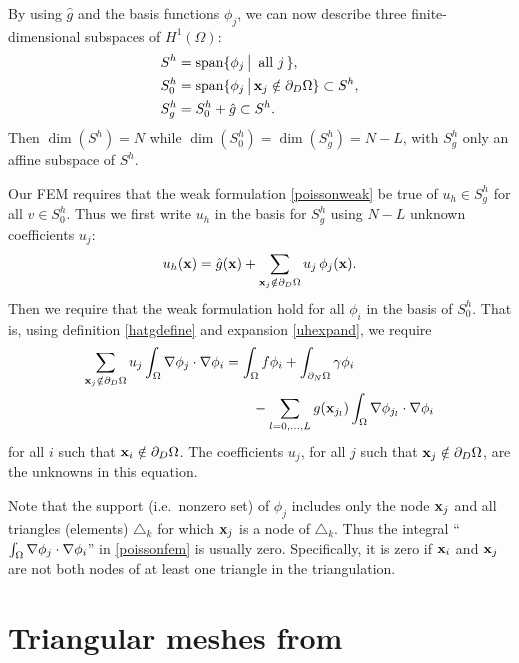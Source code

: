 By using $\hat g$ and the basis functions $\phi_j$, we can now describe three finite-dimensional subspaces of $H^1(\Omega)$:
\begin{align*}
S^h &= \operatorname{span}\{\phi_j \,\big|\, \text{ all } j\,\}, \\
S_0^h &= \operatorname{span}\{\phi_j \,\big|\, \mathbf{x}_j \notin \partial_D \Omega\} \subset S^h, \\
S_g^h &= S_0^h + \hat g \subset S^h.
\end{align*}
Then $\dim(S^h)=N$ while $\dim(S_0^h)=\dim(S_g^h)=N-L$, with $S_g^h$ only an affine subspace of $S^h$.

Our FEM requires that the weak formulation  \eqref{poissonweak} be true of $u_h\in S_g^h$ for all $v\in S_0^h$.  Thus we first write $u_h$ in the basis for $S_g^h$ using $N-L$ unknown coefficients $u_j$:
\begin{equation}
u_h(\mathbf{x}) = \hat g(\mathbf{x}) + \sum_{\mathbf{x}_j \notin \partial_D \Omega} u_j\, \phi_j(\mathbf{x}). \label{uhexpand}
\end{equation}
Then we require that the weak formulation hold for all $\phi_i$ in the basis of $S_0^h$.  That is, using definition \eqref{hatgdefine} and expansion \eqref{uhexpand}, we require
\begin{align}
\sum_{\mathbf{x}_j \notin \partial_D \Omega} u_j \int_\Omega \nabla \phi_j \cdot \nabla \phi_i &= \int_\Omega f \phi_i + \int_{\partial_N\Omega} \gamma \phi_i \label{poissonfem} \\
&\qquad - \sum_{l=0,\dots,L} g(\mathbf{x}_{j_l})  \int_\Omega \nabla \phi_{j_l} \cdot \nabla \phi_i \notag
\end{align}
for all $i$ such that $\mathbf{x}_i \notin \partial_D \Omega$.  The coefficients $u_j$, for all $j$ such that $\mathbf{x}_j \notin \partial_D \Omega$, are the unknowns in this equation.

Note that the support (i.e.~nonzero set) of $\phi_j$ includes only the node $\mathbf{x}_j$ and all triangles (elements) $\triangle_k$ for which $\mathbf{x}_j$ is a node of $\triangle_k$.  Thus the integral ``$\int_\Omega \nabla \phi_j \cdot \nabla \phi_i$'' in \eqref{poissonfem} is usually zero.  Specifically, it is zero if $\mathbf{x}_i$ and $\mathbf{x}_j$ are not both nodes of at least one triangle in the triangulation.


\section{Triangular meshes from \Triangle}

